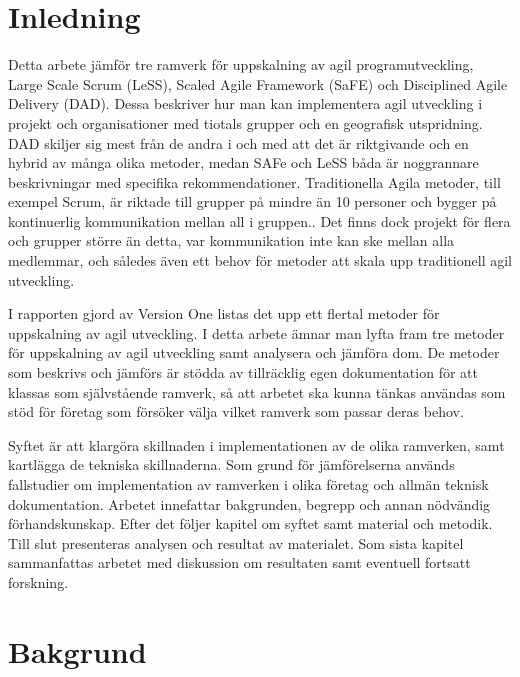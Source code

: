 \section{Inledning}
	
	Detta arbete jämför tre ramverk för uppskalning av agil programutveckling, Large Scale Scrum (LeSS), Scaled Agile Framework (SaFE) och Disciplined Agile Delivery (DAD). Dessa beskriver hur man kan implementera agil utveckling i projekt och organisationer med tiotals grupper och en geografisk utspridning. DAD skiljer sig mest från de andra i och med att det är riktgivande och en hybrid av många olika metoder, medan SAFe och LeSS båda är noggrannare beskrivningar med specifika rekommendationer.
	Traditionella Agila metoder, till exempel Scrum, är riktade till grupper på mindre än 10 personer och bygger på kontinuerlig kommunikation mellan all i gruppen.\cite{scrum_guide}. Det finns dock projekt för flera och grupper större än detta, var kommunikation inte kan ske mellan alla medlemmar, och således även ett behov för metoder att skala upp traditionell agil utveckling.
	
	I rapporten gjord av Version One \cite{version_one_report} listas det upp ett flertal metoder för uppskalning av agil utveckling. I detta arbete ämnar man lyfta fram tre metoder för uppskalning av agil utveckling samt analysera och jämföra dom. De metoder som beskrivs och jämförs är stödda av tillräcklig egen dokumentation för att klassas som självstående ramverk, så att arbetet ska kunna tänkas användas som stöd för företag som försöker välja vilket ramverk som passar deras behov.
	
	Syftet är att klargöra skillnaden i implementationen av de olika ramverken, samt kartlägga de tekniska skillnaderna. Som grund för jämförelserna används fallstudier om implementation av ramverken i olika företag och allmän teknisk dokumentation. Arbetet innefattar bakgrunden, begrepp och annan nödvändig förhandskunskap. Efter det följer kapitel om syftet samt material och metodik. Till slut presenteras analysen och resultat av materialet. Som sista kapitel sammanfattas arbetet med diskussion om resultaten samt eventuell fortsatt forskning.
	
	

\newpage
\section{Bakgrund}
	

